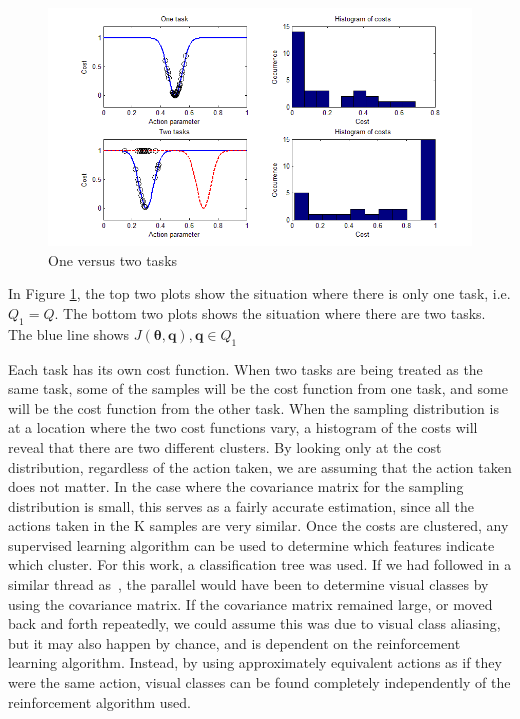 \documentclass[12pt]{article}
\newcommand{\mymath}[1]{\ensuremath{#1}\xspace}
\newcommand{\app}    {\mymath{\bm{\theta}}}
\newcommand{\taskp}  {\mymath{\mathbf{q}}}
\newcommand{\taskpsp}{\mymath{Q}}
\newcommand{\costf}  {\mymath{J}}
\begin{document}
\begin{figure}[ht]
  \centering
  \includegraphics[width=0.9\columnwidth]{one_vs_two_tasks.png}
  \caption{One versus two tasks}
  \label{fig:1vs2tasks}
\end{figure} 

In Figure \ref{fig:1vs2tasks}, the top two plots show the situation where there is only one task, i.e. $\taskpsp_1 = \taskpsp$. The bottom two plots shows the situation where there are two tasks. The blue line shows $\costf(\app,\taskp), \taskp \in \taskpsp_1$

\color{red}Each task has its own cost function. When two tasks are being treated as the same task, some of the samples will be the cost function from one task, and some will be the cost function from the other task. \color{black} When the sampling distribution is at a location where the two cost functions vary, a histogram of the costs will reveal that there are two different clusters. By looking only at the cost distribution, regardless of the action taken, we are assuming that the action taken does not matter. In the case where the covariance matrix for the sampling distribution is small, this serves as a fairly accurate estimation, since all the actions taken in the K samples are very similar. Once the costs are clustered, any supervised learning algorithm can be used to determine which features indicate which cluster. For this work, a classification tree was used. If we had followed in a similar thread as~\citet{piater11learning}, the parallel would have been to determine visual classes by using the covariance matrix. If the covariance matrix remained large, or moved back and forth repeatedly, we could assume this was due to visual class aliasing, but it may also happen by chance, and is dependent on the reinforcement learning algorithm. Instead, by using approximately equivalent actions as if they were the same action, visual classes can be found completely independently of the reinforcement algorithm used. 
\end{document}
